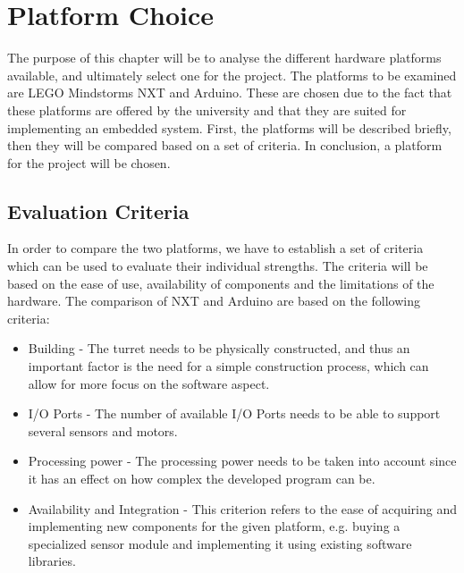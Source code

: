 \chapter{Platform Choice}\label{PlatformC}
The purpose of this chapter will be to analyse the different hardware platforms
available, and ultimately select one for the project. The platforms to be
examined are LEGO Mindstorms NXT and Arduino. These are chosen due to the fact
that these platforms are offered by the university and that they are suited for
implementing an embedded system. First, the platforms will be described briefly,
then they will be compared based on a set of criteria. In conclusion, a platform
for the project will be chosen.

\section{Evaluation Criteria}\label{EvalCrit}
In order to compare the two platforms, we have to establish a set of criteria
which can be used to evaluate their individual strengths. The criteria
will be based on the ease of use, availability of components and the limitations
of the hardware. The comparison of NXT and Arduino are based on the following
criteria:

\begin{itemize}
  \item Building - The turret needs to be physically constructed, and thus an
  important factor is the need for a simple construction process, which can
  allow for more focus on the software aspect.
  \item I/O Ports - The number of available I/O Ports needs to be able to
  support several sensors and motors.
  \item Processing power - The processing power needs to be taken into account
  since it has an effect on how complex the developed program can be.
  \item Availability and Integration - This criterion refers to the ease of
  acquiring and implementing new components for the given platform, e.g. buying
  a specialized sensor module and implementing it using existing software
  libraries.
\end{itemize}

